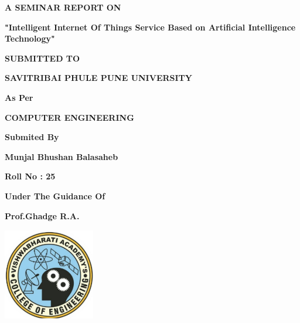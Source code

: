 \documentclass[12pt]{report}
\begin{document}
\thisfancypage{\setlength{\fboxsep}{10pt}\doublebox}{}
\clearpage\thispagestyle{empty}
\begin{flushright}\end{flushright}



 \begin{center}
   \begin{textblock*}
   \noindent\hspace{0.0in}\small{\textbf{A SEMINAR REPORT ON}}

\vspace*{0.2in}

\noindent\vspace{0.0in}\large{\textbf{\color{blue}"Intelligent Internet Of Things Service Based on Artificial
Intelligence Technology"}}
   
\vspace*{0.2in}
\textbf{\small{SUBMITTED TO}}   
   
\vspace*{0.2in}
\textbf{\large{SAVITRIBAI PHULE PUNE UNIVERSITY}}  
   
\vspace*{0.2in}
\textbf{\small{As Per}}

\vspace*{0.2in}
\textbf{\large{COMPUTER ENGINEERING}} 

\vspace*{0.2in}
\textbf{\small{Submited By}}

\vspace*{0.2in}
\textbf{\large{ Munjal Bhushan Balasaheb  }}

\vspace*{0.2in}
\textbf{\small{Roll No : 25 }}

\vspace*{0.2in}
\textbf{\small{Under The Guidance Of}}

\vspace*{0.2in}
\textbf{\large{Prof.Ghadge R.A.}}

\vspace*{0.2in}
\includegraphics[width=4cm, height=4cm]{collagelogo.png}


\end{textblock*}
\end{center}
\end{document}
